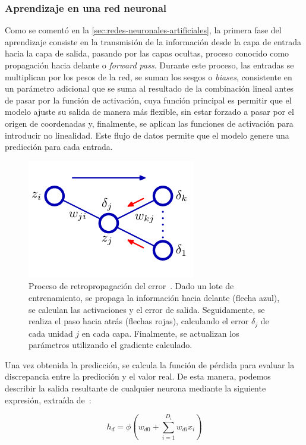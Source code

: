 \subsubsection{Aprendizaje en una red neuronal}\label{subsubsec:aprendizaje-red-neuronal}

Como se comentó en la \autoref{sec:redes-neuronales-artificiales}, la primera fase del aprendizaje consiste en la transmisión de la información desde la capa de entrada hacia la capa de salida, pasando por las capas ocultas, proceso conocido como propagación hacia delante o \emph{forward pass}. Durante este proceso, las entradas se multiplican por los pesos de la red, se suman los sesgos o \emph{biases}, consistente en un parámetro adicional que se suma al resultado de la combinación lineal antes de pasar por la función de activación, cuya función principal es permitir que el modelo ajuste su salida de manera más flexible, sin estar forzado a pasar por el origen de coordenadas y, finalmente, se aplican las funciones de activación para introducir no linealidad. Este flujo de datos permite que el modelo genere una predicción para cada entrada.\newline

\begin{figure}[h]
    \centering
    \includegraphics[width=0.3\linewidth]{img/aprendizajegd.png}
    \caption[Proceso de retropropagación del error~\cite{Bishop2006}.]{Proceso de retropropagación del error~\cite{Bishop2006}. Dado un lote de entrenamiento, se propaga la información hacia delante (flecha azul), se calculan las activaciones y el error de salida. Seguidamente, se realiza el paso hacia atrás (flechas rojas), calculando el error $\delta_j$ de cada unidad $j$ en cada capa. Finalmente, se actualizan los parámetros utilizando el gradiente calculado.}\label{fig:aprendizajegd}
\end{figure}

Una vez obtenida la predicción, se calcula la función de pérdida para evaluar la discrepancia entre la predicción y el valor real. De esta manera, podemos describir la salida resultante de cualquier neurona mediante la siguiente expresión, extraída de~\cite{Prince2023}:

\begin{equation}
    h_d = \phi \left( w_{d0} + \sum_{i=1}^{D_i} w_{di} x_i \right)
    \label{eq:hidden_unit}
\end{equation}


